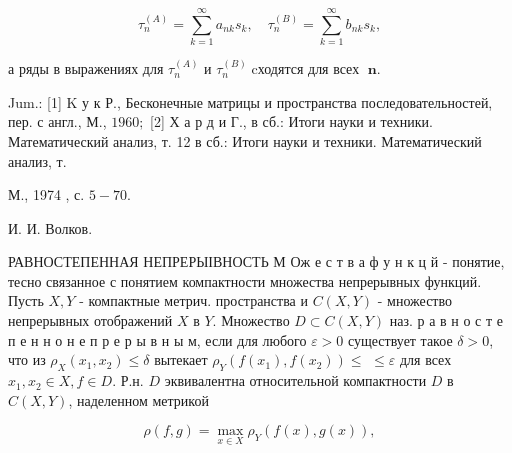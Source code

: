 \documentclass[10pt]{article}
\begin{document}
\[

\tau_{n}^{(A)}=\sum_{k=1}^{\infty} a_{n k} s_{k}, \quad \tau_{n}^{(B)}=\sum_{k=1}^{\infty} b_{n k} s_{k},

\]



а ряды в выражениях для $\tau_{n}^{(A)}$ и $\tau_{n}^{(B)} \operatorname{cходятся~для~всех~} \boldsymbol{n}$.



Jum.: [1] K у к Р., Бесконечные матрицы и пространства последовательностей, пер. с англ., М., $1960 ;$ [2] Х а р д и Г., в сб.: Итоги науки и техники. Математический анализ, т. 12 в сб.: Итоги науки и техники. Математический анализ, т.

М., 1974 , с. $5-70$.

И. И. Волков.



РАВНОСТЕПЕННАЯ НЕПРЕРЫІВНОСТЬ М Ож е с т в а ф у н к ц й - понятие, тесно связанное с понятием компактности множества непрерывных функций. Пусть $X, Y$ - компактные метрич. пространства и $C(X, Y)$ - множество непрерывных отображений $X$ в $Y$. Множество $D \subset C(X, Y)$ наз. р а в н о с т е п е н н о н е п р е р ы в н ы м, если для любого $\varepsilon>0$ существует такое $\delta>0$, что из $\rho_{X}\left(x_{1}, x_{2}\right) \leqslant \delta$ вытекает $\rho_{Y}\left(f\left(x_{1}\right), f\left(x_{2}\right)\right) \leqslant$ $\leqslant \varepsilon$ для всех $x_{1}, x_{2} \in X, f \in D$. Р.н. $D$ эквивалентна относительной компактности $D$ в $C(X, Y)$, наделенном метрикой



\[

\rho(f, g)=\max _{x \in X} \rho_{Y}(f(x), g(x)),

\]
\end{document}
